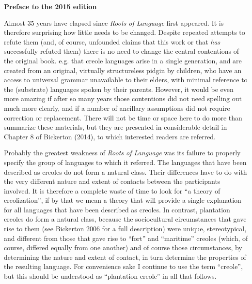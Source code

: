 \documentclass[letterpaper]{article}
\title{}
\author{}
\date{2015-10-25}
\begin{document}
\clearpage\setcounter{page}{1}\pagestyle{Standard}

\textbf{Preface to the 2015 edition}


\bigskip

Almost 35 years have elapsed since \textit{Roots of Language} first appeared.  It is therefore surprising how little needs to be changed.  Despite repeated attempts to refute them (and, of course, unfounded claims that this work or that \textit{has} successfully refuted them) there is no need to change the central contentions of the original book. e.g. that creole languages arise in a single generation, and are created from an original, virtually structureless pidgin by children, who have an access to universal grammar unavailable to their elders, with minimal reference to the (substrate) languages spoken by their parents.  However, it would be even more amazing if after so many years those contentions did not need spelling out much more clearly, and if a number of ancillary assumptions did not require correction or replacement.  There will not be time or space here to do more than summarize these materials, but they are presented in considerable detail in Chapter 8 of Bickerton (2014), to which interested readers are referred.

Probably the greatest weakness of \textit{Roots of Language} was its failure to properly specify the group of languages to which it referred.  The languages that have been described as creoles do not form a natural class. Their differences have to do with the very different nature and extent of contacts between the participants involved.  It is therefore a complete waste of time to look for “a theory of creolization”, if by that we mean a theory that will provide a single explanation for all languages that have been described as creoles.  In contrast, plantation creoles do form a natural class, because the sociocultural circumstances that gave rise to them (see Bickerton 2006 for a full description) were unique, stereotypical, and different from those that gave rise to “fort” and “maritime” creoles (which, of course, differed equally from one another) and of course those circumstances, by determining the nature and extent of contact, in turn determine the properties of the resulting language.  For convenience sake I continue to use the term “creole”, but this should be understood as “plantation creole” in all that follows.
\end{document}
